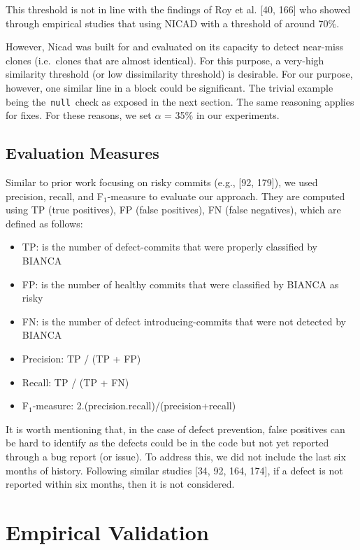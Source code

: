\documentclass[12pt]{report}
\providecommand{\tightlist}{%
  \setlength{\itemsep}{0pt}\setlength{\parskip}{0pt}}
\begin{document}
This threshold is not in line with the findings of Roy et al. {[}40,
166{]} who showed through empirical studies that using NICAD with a
threshold of around 70\%.

However, Nicad was built for and evaluated on its capacity to detect
near-miss clones (i.e.~clones that are almost identical). For this
purpose, a very-high similarity threshold (or low dissimilarity
threshold) is desirable. For our purpose, however, one similar line in a
block could be significant. The trivial example being
the~\lstinline!null!~check as exposed in the next section. The same
reasoning applies for fixes. For these reasons, we set \(\alpha\) = 35\%
in our experiments.

\subsection{Evaluation Measures}\label{evaluation-measures}

Similar to prior work focusing on risky commits (e.g., {[}92, 179{]}),
we used precision, recall, and F\(_1\)-measure to evaluate our approach.
They are computed using TP (true positives), FP (false positives), FN
(false negatives), which are defined as follows:

\begin{itemize}
\tightlist
\item
  TP: is the number of defect-commits that were properly classified by
  BIANCA
\item
  FP: is the number of healthy commits that were classified by BIANCA as
  risky
\item
  FN: is the number of defect introducing-commits that were not detected
  by BIANCA
\item
  Precision: TP / (TP + FP)
\item
  Recall: TP / (TP + FN)
\item
  F\(_1\)-measure: 2.(precision.recall)/(precision+recall)
\end{itemize}

It is worth mentioning that, in the case of defect prevention, false
positives can be hard to identify as the defects could be in the code
but not yet reported through a bug report (or issue). To address this,
we did not include the last six months of history. Following similar
studies {[}34, 92, 164, 174{]}, if a defect is not reported within six
months, then it is not considered.

\section{Empirical Validation}\label{empirical-validation-2}
\end{document}
